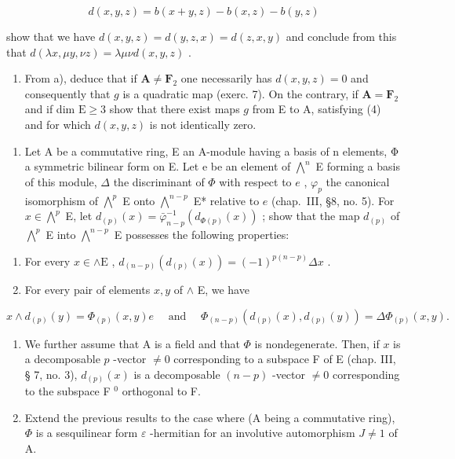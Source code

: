 \[
d (x, y, z) = b (x + y, z) - b (x, z) - b (y, z)
\]

show that we have \(d(x,y,z)=d(y,z,x)=d(z,x,y)\) and conclude from this that \(d(\lambda x,\mu y,\nu z)=\lambda\mu\nu d(x,y,z)\) .

\begin{enumerate}
\def\labelenumi{\alph{enumi})}
\setcounter{enumi}{1}
\tightlist
\item
  From a), deduce that if \(\mathbf{A} \neq \mathbf{F}_2\) one necessarily has \(d(x, y, z) = 0\) and consequently that \(g\) is a quadratic map (exerc. 7). On the contrary, if \(\mathbf{A} = \mathbf{F}_2\) and if dim \(\mathrm{E} \geqslant 3\) show that there exist maps \(g\) from E to A, satisfying (4) and for which \(d(x, y, z)\) is not identically zero.
\end{enumerate}

\begin{enumerate}
\def\labelenumi{\arabic{enumi})}
\setcounter{enumi}{8}
\tightlist
\item
  Let A be a commutative ring, E an A-module having a basis of n elements, Φ a symmetric bilinear form on E. Let e be an element of \(\bigwedge^{n}\) E forming a basis of this module, \(\Delta\) the discriminant of \(\Phi\) with respect to \(e\) , \(\varphi_{p}\) the canonical isomorphism of \(\bigwedge^{p}\) E onto \(\bigwedge^{n-p}\) E* relative to \(e\) (chap.~III, §8, no. 5). For \(x \in \bigwedge^{p}\) E, let \(d_{(p)}(x) = \bar{\varphi}_{n-p}^{-1}(d_{\Phi(p)}(x))\) ; show that the map \(d_{(p)}\) of \(\bigwedge^{p}\) E into \(\bigwedge^{n-p}\) E possesses the following properties:
\end{enumerate}

\begin{enumerate}
\def\labelenumi{\alph{enumi})}
\item
  For every \(x \in \wedge \mathrm{E}\) , \(d_{(n - p)}(d_{(p)}(x)) = (-1)^{p(n - p)}\Delta x\) .
\item
  For every pair of elements \(x, y\) of \(\wedge\) E, we have
\end{enumerate}

\[
x \wedge d _ {(p)} (y) = \Phi_ {(p)} (x, y) e \quad \text { and } \quad \Phi_ {(n - p)} (d _ {(p)} (x), d _ {(p)} (y)) = \Delta \Phi_ {(p)} (x, y).
\]

\begin{enumerate}
\def\labelenumi{\alph{enumi})}
\setcounter{enumi}{2}
\item
  We further assume that A is a field and that \(\Phi\) is nondegenerate. Then, if \(x\) is a decomposable \(p\) -vector \(\neq 0\) corresponding to a subspace F of E (chap. III, § 7, no. 3), \(d_{(p)}(x)\) is a decomposable \((n-p)\) -vector \(\neq 0\) corresponding to the subspace F \(^{0}\) orthogonal to F.
\item
  Extend the previous results to the case where (A being a commutative ring), \(\Phi\) is a sesquilinear form \(\varepsilon\) -hermitian for an involutive automorphism \(J \neq 1\) of A.
\end{enumerate}

